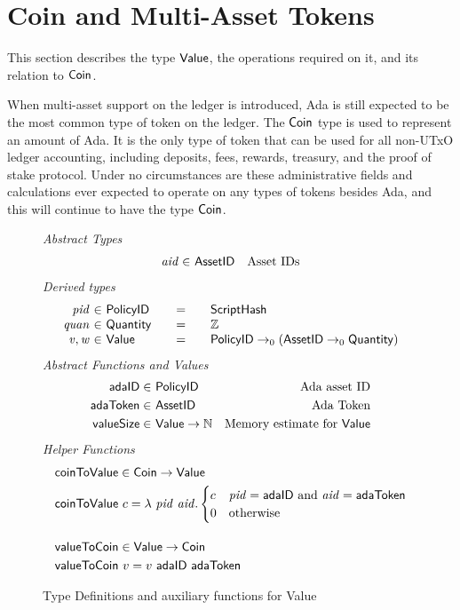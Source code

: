 \section{Coin and Multi-Asset Tokens}
\label{sec:coin-ma}

This section describes the type $\mathsf{Value}$, the operations required on
it, and its relation to $\mathsf{Coin}$.

When multi-asset support on the ledger is introduced, Ada is still expected to be
the most common type of token on the ledger.
The $\mathsf{Coin}$ type is used to represent an amount of Ada.
It is the only
type of token that can be used for all non-UTxO ledger accounting, including deposits,
fees, rewards, treasury, and the proof of stake protocol. Under no circumstances
are these administrative fields and calculations ever expected to operate on
any types of tokens besides Ada, and this will continue to have the type $\mathsf{Coin}$.

\begin{figure*}[t!]
  \emph{Abstract Types}
  \begin{align*}
    \mathit{aid} \in& ~\mathsf{AssetID} & \text{Asset IDs}
  \end{align*}
  \emph{Derived types}
  \begin{equation*}
    \begin{array}{r@{~\in~}l@{\qquad=\qquad}lr}
      \var{pid} & \PolicyID & \ScriptHash \\
      \var{quan} & \Quantity & \Z \\
      \var{v}, \var{w} & \Value
      & \PolicyID \to_0 ( \AssetID \to_0 \Quantity )
    \end{array}
  \end{equation*}
  \emph{Abstract Functions and Values}
  \begin{align*}
    \mathsf{adaID} \in& ~\mathsf{PolicyID} & \text{Ada asset ID} \\
    \mathsf{adaToken} \in& ~\mathsf{AssetID} & \text{Ada Token} \\
    \mathsf{valueSize} \in& ~\mathsf{Value} \to \mathbb{N} & \text{Memory estimate for}~\mathsf{Value}
  \end{align*}
  \emph{Helper Functions}
  \begin{align*}
    & \fun{coinToValue} \in \Coin\to \Value \\
    & \fun{coinToValue}~c = \lambda~\var{pid}~\var{aid}.
      \begin{cases}
        c & \var{pid} = \mathsf{adaID}~\text{and}~\var{aid} = \mathsf{adaToken} \\
        0 & \text{otherwise}
      \end{cases}
    \nextdef
    & \fun{valueToCoin} \in \Value \to \Coin \\
    & \fun{valueToCoin}~v = v~\mathsf{adaID}~\mathsf{adaToken}
  \end{align*}
  \caption{Type Definitions and auxiliary functions for Value}
  \label{fig:defs:value}
\end{figure*}

